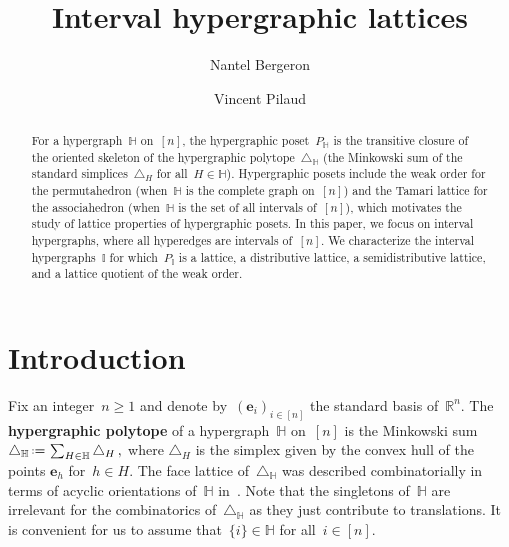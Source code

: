 \documentclass{amsart}
\title{Interval hypergraphic lattices}
\author[N.~Bergeron]{Nantel Bergeron}
\author{Vincent Pilaud}
\theoremstyle{definition}
\newcommand{\R}{\mathbb{R}} %
\renewcommand{\b}[1]{\boldsymbol{#1}} %
\newcommand{\eqdef}{\mbox{\,\raisebox{0.2ex}{\scriptsize\ensuremath{\mathrm:}}\ensuremath{=}\,}} %
\newcommand{\simplex}{\triangle} %
\newcommand{\defn}[1]{\textbf{\textsf{\color{PineGreen} #1}}} %
\newcommand{\HH}{\mathbb H}  %
\newcommand{\II}{\mathbb I} %
\begin{document}
\begin{abstract}
For a hypergraph~$\HH$ on~$[n]$, the hypergraphic poset~$P_\HH$ is the transitive closure of the oriented skeleton of the hypergraphic polytope~$\simplex_\HH$ (the Minkowski sum of the standard simplices~$\simplex_H$ for all~$H \in \HH$).
Hypergraphic posets include the weak order for the permutahedron (when~$\HH$ is the complete graph on~$[n]$) and the Tamari lattice for the associahedron (when~$\HH$ is the set of all intervals of~$[n]$), which motivates the study of lattice properties of hypergraphic posets.
In this paper, we focus on interval hypergraphs, where all hyperedges are intervals of~$[n]$.
We characterize the interval hypergraphs~$\II$ for which~$P_\II$ is a lattice, a distributive lattice, a semidistributive lattice, and a lattice quotient of the weak order.
\end{abstract}

\maketitle

\tableofcontents


\pagebreak

\section{Introduction}
\label{sec:introduction}

Fix an integer~$n \ge 1$ and denote by~$(\b{e}_i)_{i \in [n]}$ the standard basis of~$\R^n$.
The \defn{hypergraphic polytope} of a hypergraph~$\HH$ on~$[n]$ is the Minkowski sum
\(
\simplex_\HH \eqdef \sum_{H\in \HH} \simplex_H\,,
\)
where $\simplex_H$ is the simplex given by the convex hull of the points $\b{e}_h$ for~$h \in H$.
The face lattice of~$\simplex_\HH$ was described combinatorially in terms of acyclic orientations of~$\HH$ in~\cite{BenedettiBergeronMachacek}.
Note that the singletons of~$\HH$ are irrelevant for the combinatorics of~$\triangle_\HH$ as they just contribute to translations.
It is convenient for us to assume that~$\{i\} \in \HH$ for all~$i \in [n]$.
\end{document}

